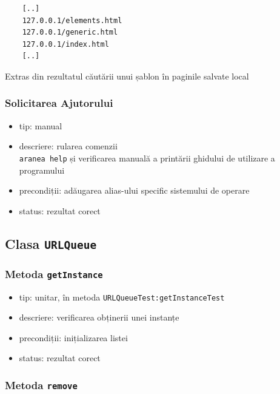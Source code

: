 \documentclass[12pt]{article}
\begin{document}
\vspace{0.3cm}
\begin{listing}[ht]
    \begin{verbatim}
	[..]
	127.0.0.1/elements.html
	127.0.0.1/generic.html
	127.0.0.1/index.html
	[..]
    \end{verbatim}
    \caption{Extras din rezultatul căutării unui șablon în paginile salvate local}
    \label{listing:1}
\end{listing}
\vspace{0.3cm}

\subsubsection{Solicitarea Ajutorului}

\begin{itemize}
    \item tip: manual
    \item descriere: rularea comenzii \\ \texttt{aranea help} și verificarea manuală a printării ghidului de utilizare a programului
    \item precondiții: adăugarea alias-ului specific sistemului de operare
    \item status: rezultat corect
\end{itemize}

\subsection{Clasa \texttt{URLQueue}}

\subsubsection{Metoda \texttt{getInstance}}

\begin{itemize}
    \item tip: unitar, în metoda \texttt{URLQueueTest:getInstanceTest}
    \item descriere: verificarea obținerii unei instanțe
    \item precondiții: inițializarea listei
    \item status: rezultat corect
\end{itemize}

\subsubsection{Metoda \texttt{remove}}
\end{document}
